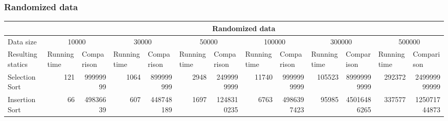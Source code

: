 \documentclass{article}
\begin{document}
\subsubsection{Randomized data}
\begin{table}[H]
\begin{adjustbox}{width=\columnwidth,center}
\begin{tabular}{|l|rrrrrrrrrrrr|}
\hline
                                   & \multicolumn{12}{c|}{Randomized data}                                                                                                                                                                                                                                                                                                                                                                                              \\ \hline
Data size                          & \multicolumn{2}{c|}{10000}                                          & \multicolumn{2}{c|}{30000}                                          & \multicolumn{2}{c|}{50000}                                          & \multicolumn{2}{c|}{100000}                                         & \multicolumn{2}{c|}{300000}                                          & \multicolumn{2}{c|}{500000}                                         \\ \hline
Resulting statics                  & \multicolumn{1}{l|}{Running time} & \multicolumn{1}{l|}{Comparison} & \multicolumn{1}{l|}{Running time} & \multicolumn{1}{l|}{Comparison} & \multicolumn{1}{l|}{Running time} & \multicolumn{1}{l|}{Comparison} & \multicolumn{1}{l|}{Running time} & \multicolumn{1}{l|}{Comparison} & \multicolumn{1}{l|}{Running time} & \multicolumn{1}{l|}{Comparison}  & \multicolumn{1}{l|}{Running time} & \multicolumn{1}{l|}{Comparison} \\ \hline
Selection Sort                     & \multicolumn{1}{r|}{121}          & \multicolumn{1}{r|}{99999999}   & \multicolumn{1}{r|}{1064}         & \multicolumn{1}{r|}{899999999}  & \multicolumn{1}{r|}{2948}         & \multicolumn{1}{r|}{2499999999} & \multicolumn{1}{r|}{11740}        & \multicolumn{1}{r|}{9999999999} & \multicolumn{1}{r|}{105523}       & \multicolumn{1}{r|}{89999999999} & \multicolumn{1}{r|}{292372}       & 249999999999                    \\ \hline
Insertion Sort                     & \multicolumn{1}{r|}{66}           & \multicolumn{1}{r|}{49836639}   & \multicolumn{1}{r|}{607}          & \multicolumn{1}{r|}{448748189}  & \multicolumn{1}{r|}{1697}         & \multicolumn{1}{r|}{1248310235} & \multicolumn{1}{r|}{6763}         & \multicolumn{1}{r|}{4986397423} & \multicolumn{1}{r|}{95985}        & \multicolumn{1}{r|}{45016486265} & \multicolumn{1}{r|}{337577}       & 125071744873                    \\ \hline

\end{tabular}
\end{adjustbox}
\end{table}
\end{document}
